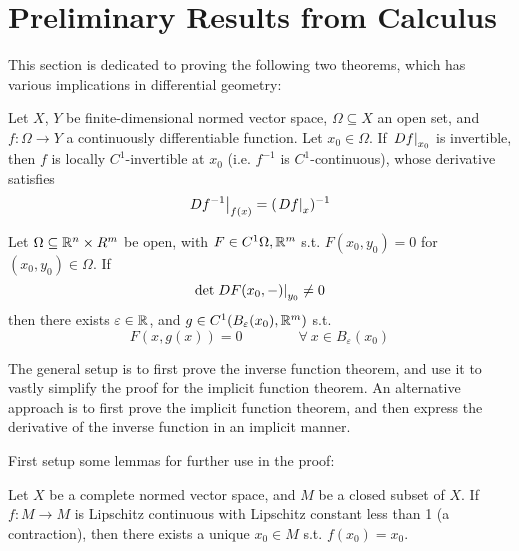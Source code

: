 \documentclass{article}
\begin{document}

\tableofcontents
\newpage

\def\open{\mathcal{O}}

\section{Preliminary Results from Calculus}

This section is dedicated to proving the following two theorems, which has various implications in differential geometry:

\begin{theorem}\label{thm: inverse function theorem}
    Let $X$, $Y$ be finite-dimensional normed vector space, $\Omega \subseteq X$ an open set, and $f: \Omega \to Y$ a continuously differentiable function. Let $x_0 \in \Omega$. If $\left.Df\right|_{x_0}$ is invertible, then $f$ is locally $C^{1}$-invertible at $x_0$ (i.e. $f^{-1}$ is $C^1$-continuous), whose derivative satisfies
    \[
        \left.Df^{-1}\right|_{f(x)} = (\left.Df\right|_{x})^{-1}
    \]
\end{theorem}
\vspace{1em}

\begin{theorem}\label{thm: implicit function theorem}
    Let $\Omega \subseteq \mathbb{R}^n \times R^m$ be open, with $F \in C^1{\Omega, \mathbb{R}^m}$ s.t. $F(x_0, y_0) = 0$ for $(x_0, y_0) \in \Omega$. If
    \[
        \det \left.DF(x_0, -)\right|_{y_0} \neq 0
    \]
    then there exists $\varepsilon \in \mathbb{R}$, and $g \in C^1(B_{\varepsilon}(x_0), \mathbb{R}^m)$ s.t.
    \[
        F(x, g(x)) = 0 \qquad \qquad \forall \ x \in B_{\varepsilon}(x_0)
    \]
\end{theorem}

The general setup is to first prove the inverse function theorem, and use it to vastly simplify the proof for the implicit function theorem. An alternative approach is to first prove the implicit function theorem, and then express the derivative of the inverse function in an implicit manner. 

First setup some lemmas for further use in the proof:

\begin{lemma}\label{lem: contraction mapping principle}
    Let $X$ be a complete normed vector space, and $M$ be a closed subset of $X$. If $f: M \to M$ is Lipschitz continuous with Lipschitz constant less than 1 (a contraction), then there exists a unique $x_0 \in M$ s.t. $f(x_0) = x_0$.
\end{lemma}
\end{document}
